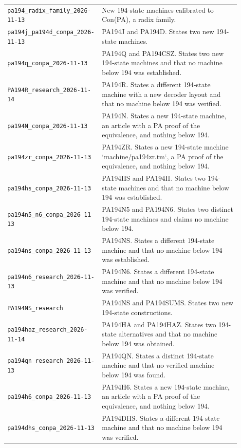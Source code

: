 \begin{longtable}{@{}p{0.36\linewidth}p{0.59\linewidth}@{}}
\nolinkurl{pa194_radix_family_2026-11-13} & New 194-state machines calibrated to Con(PA), a radix family.\\[4pt]
\nolinkurl{pa194j_pa194d_conpa_2026-11-13} & PA194J and PA194D. States two new 194-state machines.\\[4pt]
\nolinkurl{pa194q_conpa_2026-11-13} & PA194Q and PA194CSZ. States two new 194-state machines and that no machine below 194 was established.\\[4pt]
\nolinkurl{PA194R_research_2026-11-14} & PA194R. States a different 194-state machine with a new decoder layout and that no machine below 194 was verified.\\[4pt]
\nolinkurl{pa194N_conpa_2026-11-13} & PA194N. States a new 194-state machine, an article with a PA proof of the equivalence, and nothing below 194.\\[4pt]
\nolinkurl{pa194zr_conpa_2026-11-13} & PA194ZR. States a new 194-state machine `machine/pa194zr.tm`, a PA proof of the equivalence, and nothing below 194.\\[4pt]
\nolinkurl{pa194hs_conpa_2026-11-13} & PA194HS and PA194H. States two 194-state machines and that no machine below 194 was established.\\[4pt]
\nolinkurl{pa194n5_n6_conpa_2026-11-13} & PA194N5 and PA194N6. States two distinct 194-state machines and claims no machine below 194.\\[4pt]
\nolinkurl{pa194ns_conpa_2026-11-13} & PA194NS. States a different 194-state machine and that no machine below 194 was established.\\[4pt]
\nolinkurl{pa194n6_research_2026-11-13} & PA194N6. States a different 194-state machine and that no machine below 194 was verified.\\[4pt]
\nolinkurl{PA194NS_research} & PA194NS and PA194SUMS. States two new 194-state constructions.\\[4pt]
\nolinkurl{pa194haz_research_2026-11-14} & PA194HA and PA194HAZ. States two 194-state alternatives and that no machine below 194 was obtained.\\[4pt]
\nolinkurl{pa194qn_research_2026-11-13} & PA194QN. States a distinct 194-state machine and that no verified machine below 194 was found.\\[4pt]
\nolinkurl{pa194h6_conpa_2026-11-13} & PA194H6. States a new 194-state machine, an article with a PA proof of the equivalence, and nothing below 194.\\[4pt]
\nolinkurl{pa194dhs_conpa_2026-11-13} & PA194DHS. States a different 194-state machine and that no machine below 194 was verified.\\[4pt]

\end{longtable}
